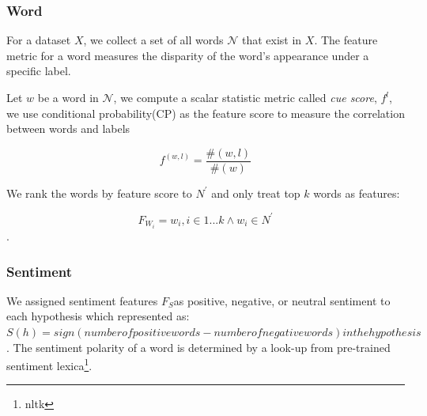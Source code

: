 \subsubsection{Word} For a dataset $X$, 
we collect a set of all words $\mathcal{N}$ that exist in $X$. 
The feature metric for a word measures the disparity of the word's appearance under 
 a specific label. 

Let $w$ be a word in $\mathcal{N}$, we compute a scalar statistic metric 
called {\em cue score}, $f^l$,  we use conditional probability(CP)
as the feature score to measure the correlation between words and labels 

\begin{equation}
    f^{(w,l)} = \frac{\#(w, l)}{\#(w)}
\end{equation}

We rank the words by feature score to $N^{'}$ and 
only treat top $k$ words as features:

\begin{equation}
    F_{W_i} = {w}_{i} , i \in 1...k \wedge w_{i} \in N^{'}
\end{equation}.
%

\subsubsection{Sentiment}

We assigned sentiment features $F_{S}$as 
positive, negative, or neutral sentiment to each hypothesis which 
represented as: 
$S(h) = sign(number of positive words - number of negative words) in the hypothesis$.
The sentiment polarity of a word
is determined by a look-up from pre-trained
sentiment lexica\footnote{nltk}. 

